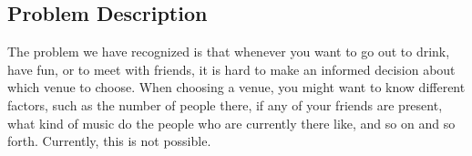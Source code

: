 \subsection{Problem Description}

The problem we have recognized is that whenever you want to go out to drink, have fun, or to meet with friends, it is hard to make an informed decision about which venue to choose. When choosing a venue, you might want to know different factors, such as the number of people there, if any of your friends are present, what kind of music do the people who are currently there like, and so on and so forth. Currently, this is not possible.